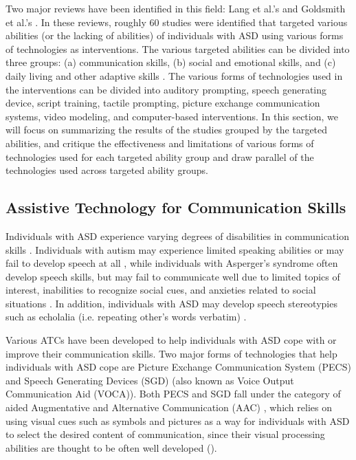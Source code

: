 \documentclass{ut-thesis}
\begin{document}
Two major reviews have been identified in this field: Lang et al.'s \cite{lang2014assistive} and Goldsmith et al.'s \cite{goldsmith2004use}.  In these reviews, roughly 60 studies were identified that targeted various abilities (or the lacking of abilities) of individuals with ASD using various forms of technologies as interventions.  The various targeted abilities can be divided into three groups: (a) communication skills, (b) social and emotional skills, and (c) daily living and other adaptive skills \cite{lang2014assistive}.  The various forms of technologies used in the interventions can be divided into auditory prompting, speech generating device, script training, tactile prompting, picture exchange communication systems, video modeling, and computer-based interventions.  In this section, we will focus on summarizing the results of the studies grouped by the targeted abilities, and critique the effectiveness and limitations of various forms of technologies used for each targeted ability group and draw parallel of the technologies used across targeted ability groups.

\subsection{Assistive Technology for Communication Skills}
Individuals with ASD experience varying degrees of disabilities in communication skills \cite{howlin2003outcome}.  Individuals with autism may experience limited speaking abilities or may fail to develop speech at all \cite{weitz1997aac}, while individuals with Asperger's syndrome often develop speech skills, but may fail to communicate well due to limited topics of interest, inabilities to recognize social cues, and anxieties related to social situations \cite{scheuermann2002teaching}.  In addition, individuals with ASD may develop speech stereotypies such as echolalia (i.e. repeating other's words verbatim) \cite{sigafoos2007assessing}.

Various ATCs have been developed to help individuals with ASD cope with or improve their communication skills.  Two major forms of technologies that help individuals with ASD cope are Picture Exchange Communication System (PECS) and Speech Generating Devices (SGD) (also known as Voice Output Communication Aid (VOCA)).  Both PECS and SGD fall under the category of aided Augmentative and Alternative Communication (AAC) \cite{sigafoos2001conditional}, which relies on using visual cues such as symbols and pictures as a way for individuals with ASD to select the desired content of communication, since their visual processing abilities are thought to be often well developed (\cite{mirenda2001autism, shane2012applying}).
\end{document}
